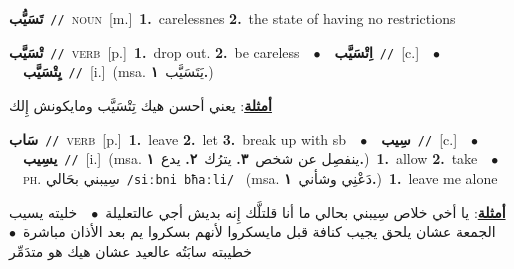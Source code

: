 \documentclass[10pt,a4paper,twoside]{article} %
\begin{document}
\begin{multicols}{2}
{\setlength\topsep{0pt}\textbf{\foreignlanguage{arabic}{تَسَيُّب}}\ {\color{gray}\texttt{//}\color{black}}\ \textsc{noun}\ [m.]\ \textbf{1.}~carelessnes  \textbf{2.}~the state of having no restrictions\ } \vspace{2mm}

{\setlength\topsep{0pt}\textbf{\foreignlanguage{arabic}{تْسَيَّب}}\ {\color{gray}\texttt{//}\color{black}}\ \textsc{verb}\ [p.]\ \textbf{1.}~drop out.  \textbf{2.}~be careless\ \ $\bullet$\ \ \setlength\topsep{0pt}\textbf{\foreignlanguage{arabic}{اِتْسَيَّب}}\ {\color{gray}\texttt{//}\color{black}}\ [c.]\ \ $\bullet$\ \ \setlength\topsep{0pt}\textbf{\foreignlanguage{arabic}{يِتْسَيَّب}}\ {\color{gray}\texttt{//}\color{black}}\ [i.]\ \color{gray}(msa. \foreignlanguage{arabic}{يَتَسَيَّب}~\foreignlanguage{arabic}{\textbf{١.}})\color{black}\  \begin{flushright}\color{gray}\foreignlanguage{arabic}{\textbf{\underline{\foreignlanguage{arabic}{أمثلة}}}: يعني أحسن هيك تِتْسَيَّب ومايكونش إِلك}\end{flushright}\color{black}} \vspace{2mm}

{\setlength\topsep{0pt}\textbf{\foreignlanguage{arabic}{سَاب}}\ {\color{gray}\texttt{//}\color{black}}\ \textsc{verb}\ [p.]\ \textbf{1.}~leave  \textbf{2.}~let  \textbf{3.}~break up with sb\ \ $\bullet$\ \ \setlength\topsep{0pt}\textbf{\foreignlanguage{arabic}{سِيب}}\ {\color{gray}\texttt{//}\color{black}}\ [c.]\ \ $\bullet$\ \ \setlength\topsep{0pt}\textbf{\foreignlanguage{arabic}{يسِيب}}\ {\color{gray}\texttt{//}\color{black}}\ [i.]\ \color{gray}(msa. \foreignlanguage{arabic}{ينفصِل عن شخص}~\foreignlanguage{arabic}{\textbf{٣.}}  \foreignlanguage{arabic}{يترُك}~\foreignlanguage{arabic}{\textbf{٢.}}  \foreignlanguage{arabic}{يدع}~\foreignlanguage{arabic}{\textbf{١.}})\color{black}\ \textbf{1.}~allow  \textbf{2.}~take\ \ $\bullet$\ \ \textsc{ph.} \color{gray} \foreignlanguage{arabic}{سِيبني بحَالي}\color{black}\ {\color{gray}\texttt{/{\sffamily siːbni bħaːli}/}\color{black}}\ \color{gray} (msa. \foreignlanguage{arabic}{دَعْنِي وشأني}~\foreignlanguage{arabic}{\textbf{١.}})\color{black}\ \textbf{1.}~leave me alone\  \begin{flushright}\color{gray}\foreignlanguage{arabic}{\textbf{\underline{\foreignlanguage{arabic}{أمثلة}}}: يا أخي خلاص سِيبني بحالي ما أنا قلتلَّك إِنه بديش أجي عالتعليلة\ $\bullet$\ \  خليته يسيب الجمعة عشان يلحق يجيب كنافة قبل مايسكروا لأنهم بسكروا يم بعد الأذان مباشرة\ $\bullet$\ \  خطيبته سابَتُه عالعيد عشان هيك هو متدَمِّر}\end{flushright}\color{black}} \vspace{2mm}


\end{multicols}
\end{document}
